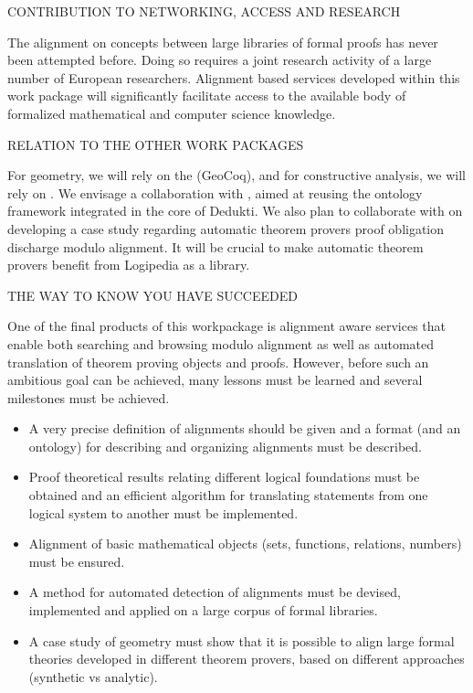 {\color{red} CONTRIBUTION TO NETWORKING, ACCESS AND RESEARCH}

The alignment on concepts between large libraries of formal proofs has
never been attempted before.  Doing so requires a joint research
activity of a large number of European researchers.  Alignment based
services developed within this work package will significantly
facilitate access to the available body of formalized mathematical and
computer science knowledge.

{\color{red} RELATION TO THE OTHER WORK PACKAGES}

For geometry, we will rely on the 
(GeoCoq), and for constructive analysis, we will rely on
. We envisage a collaboration with
, aimed at reusing the ontology framework
integrated in the core of Dedukti. We also plan to collaborate with
 on developing a case study regarding automatic theorem provers proof
obligation discharge modulo alignment. It will be crucial to make
automatic theorem provers benefit from Logipedia as a library.

{\color{red} THE WAY TO KNOW YOU HAVE SUCCEEDED }

One of the final products of this workpackage is alignment aware services
that enable both searching and browsing modulo alignment as well as
automated translation of theorem proving objects and proofs.  However,
before such an ambitious goal can be achieved, many lessons must be
learned and several milestones must be achieved.
\begin{itemize}
\item A very precise definition of alignments should be given and a
  format (and an ontology) for describing and organizing alignments
  must be described.
\item Proof theoretical results relating different logical foundations
  must be obtained and an efficient algorithm for translating
  statements from one logical system to another must be implemented.
\item Alignment of basic mathematical objects (sets, functions,
  relations, numbers) must be ensured.
\item A method for automated detection of alignments must be devised,
  implemented and applied on a large corpus of formal libraries.
\item A case study of geometry must show that it is possible to align
  large formal theories developed in different theorem provers, based
  on different approaches (synthetic vs analytic).
\end{itemize}


